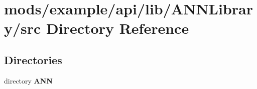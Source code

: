 \section{mods/example/api/lib/\+A\+N\+N\+Library/src Directory Reference}
\label{dir_f92b04798b1274d2d08cb7aedeb5cde0}
\subsection*{Directories}
\begin{DoxyCompactItemize}
\item 
directory {\bf A\+N\+N}
\end{DoxyCompactItemize}
